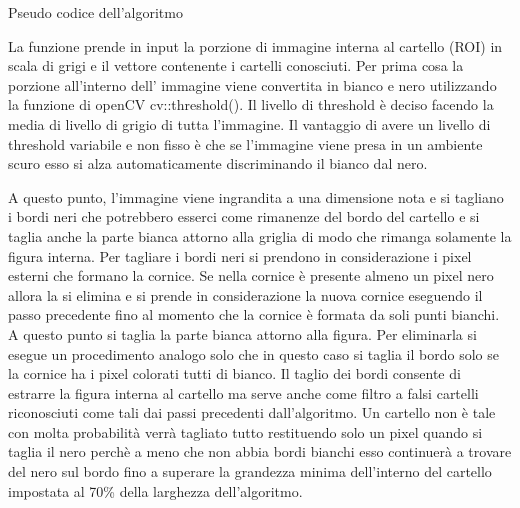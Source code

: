 		\begin{algorithm}[htp]
		\SetAlgoLined
		\caption{Pseudo codice dell'algoritmo}
		\end{algorithm}

		La funzione prende in input la porzione di immagine interna al cartello (ROI) in scala di grigi e il vettore contenente i cartelli conosciuti. Per prima cosa la porzione all'interno dell' immagine viene convertita in bianco e nero utilizzando la funzione di openCV cv::threshold(). Il livello di threshold è deciso facendo la media di livello di grigio di tutta l'immagine. Il vantaggio di avere un livello di threshold variabile e non fisso è che se l'immagine viene presa in un ambiente scuro esso si alza automaticamente discriminando il bianco dal nero.
		
		A questo punto, l'immagine viene ingrandita a una dimensione nota e si tagliano i bordi neri che potrebbero esserci come rimanenze del bordo del cartello e si taglia anche la parte bianca attorno alla griglia di modo che rimanga solamente la figura interna. Per tagliare i bordi neri si prendono in considerazione i pixel esterni che formano la cornice. Se nella cornice è presente almeno un pixel nero allora la si elimina e si prende in considerazione la nuova cornice eseguendo il passo precedente fino al momento che la cornice è formata da soli punti bianchi. A questo punto si taglia la parte bianca attorno alla figura. Per eliminarla si esegue un procedimento analogo solo che in questo caso si taglia il bordo solo se la cornice ha i pixel colorati tutti di bianco. Il taglio dei bordi consente di estrarre la figura interna al cartello ma serve anche come filtro a falsi cartelli riconosciuti come tali dai passi precedenti dall'algoritmo. Un cartello non è tale con molta probabilità verrà tagliato  tutto restituendo solo un pixel quando si taglia il nero perchè a meno che non abbia bordi bianchi esso continuerà a trovare del nero sul bordo fino a superare la grandezza minima dell'interno del cartello impostata al 70\% della larghezza dell'algoritmo.
		
